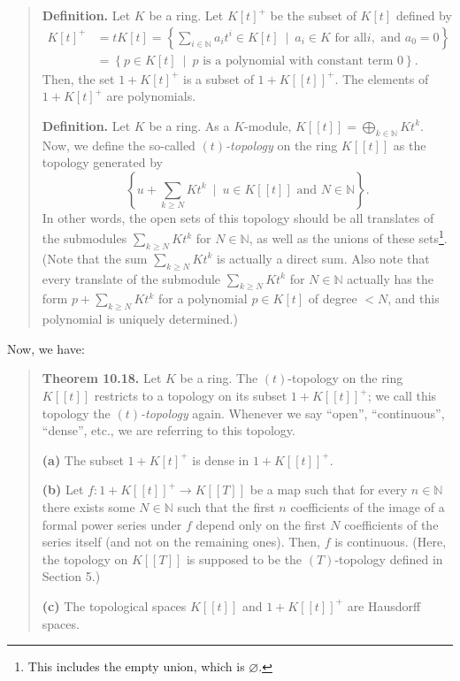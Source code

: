 \documentclass[numbers=enddot,12pt,final,onecolumn,notitlepage]{scrartcl}%
\begin{document}
\begin{quote}
\textbf{Definition.} Let $K$ be a ring. Let $K\left[  t\right]  ^{+}$ be the
subset of $K\left[  t\right]  $ defined by%
\begin{align*}
K\left[  t\right]  ^{+}  &  =tK\left[  t\right]  =\left\{  \sum_{i\in
\mathbb{N}}a_{i}t^{i}\in K\left[  t\right]  \ \mid\ a_{i}\in K\text{ for all
}i,\text{ and }a_{0}=0\right\} \\
&  =\left\{  p\in K\left[  t\right]  \ \mid\ p\text{ is a polynomial with
constant term }0\right\}  .
\end{align*}
Then, the set $1+K\left[  t\right]  ^{+}$ is a subset of $1+K\left[  \left[
t\right]  \right]  ^{+}.$ The elements of $1+K\left[  t\right]  ^{+}$ are polynomials.

\textbf{Definition.} Let $K$ be a ring. As a $K$-module, $K\left[  \left[
t\right]  \right]  =\bigoplus\limits_{k\in\mathbb{N}}Kt^{k}$. Now, we define
the so-called $\left(  t\right)  $\textit{-topology} on the ring $K\left[
\left[  t\right]  \right]  $ as the topology generated by%
\[
\left\{  u+\sum_{k\geq N}Kt^{k}\ \mid\ u\in K\left[  \left[  t\right]
\right]  \text{ and }N\in\mathbb{N}\right\}  .
\]
In other words, the open sets of this topology should be all translates of the
submodules $\sum\limits_{k\geq N}Kt^{k}$ for $N\in\mathbb{N}$, as well as the
unions of these sets\footnote{This includes the empty union, which is
$\varnothing$.}. (Note that the sum $\sum\limits_{k\geq N}Kt^{k}$ is actually
a direct sum. Also note that every translate of the submodule $\sum
\limits_{k\geq N}Kt^{k}$ for $N\in\mathbb{N}$ actually has the form
$p+\sum\limits_{k\geq N}Kt^{k}$ for a polynomial $p\in K\left[  t\right]  $ of
degree $<N$, and this polynomial is uniquely determined.)
\end{quote}

Now, we have:

\begin{quote}
\textbf{Theorem 10.18.} Let $K$ be a ring. The $\left(  t\right)  $-topology
on the ring $K\left[  \left[  t\right]  \right]  $ restricts to a topology on
its subset $1+K\left[  \left[  t\right]  \right]  ^{+}$; we call this topology
the $\left(  t\right)  $\textit{-topology} again. Whenever we say ``open'',
``continuous'', ``dense'', etc., we are referring to this topology.

\textbf{(a)} The subset $1+K\left[  t\right]  ^{+}$ is dense in $1+K\left[
\left[  t\right]  \right]  ^{+}$.

\textbf{(b)} Let $f:1+K\left[  \left[  t\right]  \right]  ^{+}\rightarrow
K\left[  \left[  T\right]  \right]  $ be a map such that for every
$n\in\mathbb{N}$ there exists some $N\in\mathbb{N}$ such that the first $n$
coefficients of the image of a formal power series under $f$ depend only on
the first $N$ coefficients of the series itself (and not on the remaining
ones). Then, $f$ is continuous. (Here, the topology on $K\left[  \left[
T\right]  \right]  $ is supposed to be the $\left(  T\right)  $-topology
defined in Section 5.)

\textbf{(c)} The topological spaces $K\left[  \left[  t\right]  \right]  $ and
$1+K\left[  \left[  t\right]  \right]  ^{+}$ are Hausdorff spaces.
\end{quote}
\end{document}
